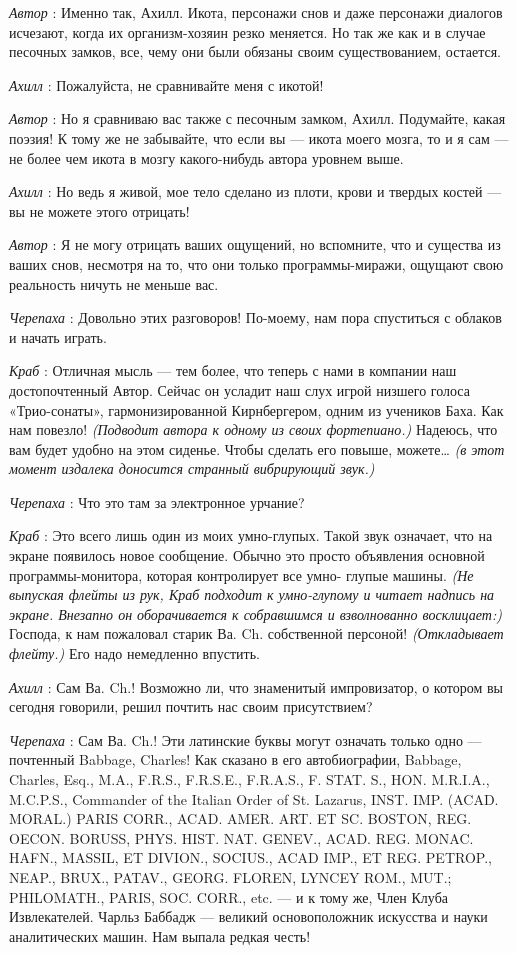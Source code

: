\documentclass[../main.tex]{subfiles}
\begin{document}
\begin{dialogue}
\emph{Автор} : Именно так, Ахилл. Икота, персонажи снов и даже персонажи диалогов исчезают, когда их организм-хозяин резко меняется. Но так же как и в случае песочных замков, все, чему они были обязаны своим существованием, остается.

\emph{Ахилл} : Пожалуйста, не сравнивайте меня с икотой!

\emph{Автор} : Но я сравниваю вас также с песочным замком, Ахилл. Подумайте, какая поэзия! К тому же не забывайте, что если вы --- икота моего мозга, то и я сам --- не более чем икота в мозгу какого-нибудь автора уровнем выше.

\emph{Ахилл} : Но ведь я живой, мое тело сделано из плоти, крови и твердых костей --- вы не можете этого отрицать!

\emph{Автор} : Я не могу отрицать ваших ощущений, но вспомните, что и существа из ваших снов, несмотря на то, что они только программы-миражи, ощущают свою реальность ничуть не меньше вас.

\emph{Черепаха} : Довольно этих разговоров! По-моему, нам пора спуститься с облаков и начать играть.

\emph{Краб} : Отличная мысль --- тем более, что теперь с нами в компании наш достопочтенный Автор. Сейчас он усладит наш слух игрой низшего голоса «Трио-сонаты», гармонизированной Кирнбергером, одним из учеников Баха. Как нам повезло! \emph{(Подводит автора к одному из своих фортепиано.)} Надеюсь, что вам будет удобно на этом сиденье. Чтобы сделать его повыше, можете\ldots{} \emph{(в этот момент издалека доносится странный вибрирующий звук.)}

\emph{Черепаха} : Что это там за электронное урчание?

\emph{Краб} : Это всего лишь один из моих умно-глупых. Такой звук означает, что на экране появилось новое сообщение. Обычно это просто объявления основной программы-монитора, которая контролирует все умно- глупые машины. \emph{(Не выпуская флейты из рук, Краб подходит к умно-глупому и читает надпись на экране. Внезапно он оборачивается к собравшимся и взволнованно восклицает:)} Господа, к нам пожаловал старик Ва. Ch. собственной персоной! \emph{(Откладывает флейту.)} Его надо немедленно впустить.

\emph{Ахилл} : Сам Ва. Ch.! Возможно ли, что знаменитый импровизатор, о котором вы сегодня говорили, решил почтить нас своим присутствием?

\emph{Черепаха} : Сам Ва. Ch.! Эти латинские буквы могут означать только одно --- почтенный Babbage, Charles! Как сказано в его автобиографии, Babbage, Charles, Esq., M.A., F.R.S., F.R.S.E., F.R.A.S., F. STAT. S., HON. M.R.I.A., M.C.P.S., Commander of the Italian Order of St. Lazarus, INST. IMP. (ACAD. MORAL.) PARIS CORR., ACAD. AMER. ART. ET SC. BOSTON, REG. OECON. BORUSS, PHYS. HIST. NAT. GENEV., ACAD. REG. MONAC. HAFN., MASSIL, ET DIVION., SOCIUS., ACAD IMP., ET REG. PETROP., NEAP., BRUX., PATAV., GEORG. FLOREN, LYNCEY ROM., MUT.; PHILOMATH., PARIS, SOC. CORR., etc. --- и к тому же, Член Клуба Извлекателей. Чарльз Баббадж --- великий основоположник искусства и науки аналитических машин. Нам выпала редкая честь!


\end{dialogue}
\end{document}
